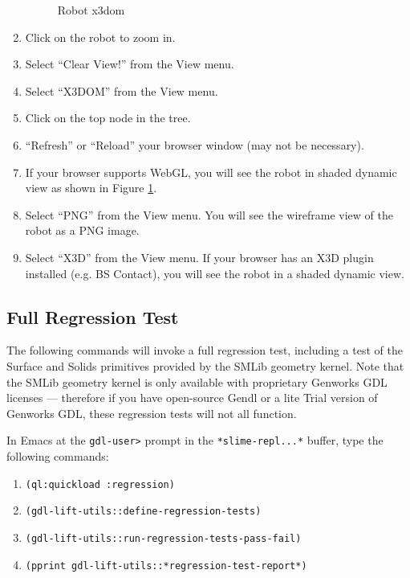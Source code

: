 \documentclass [11pt]{book}
\begin{document}
\begin{enumerate}
\begin{figure}
\caption{Robot x3dom}

\label{fig:tasty-robot-x3dom}

\end{figure}

\item Click on the robot to zoom in.

\item Select ``Clear View!'' from the View menu.

\item Select ``X3DOM'' from the View menu.

\item Click on the top node in the tree.

\item ``Refresh'' or ``Reload'' your browser window (may not be necessary).

\item If your browser supports WebGL, you will see the robot in shaded dynamic view as shown in Figure
\ref{fig:tasty-robot-x3dom}.

\item Select ``PNG'' from the View menu. You will see the
	 wireframe view of the robot as a PNG image.

\item Select ``X3D'' from the View menu. If your browser
has an X3D plugin installed (e.g. BS Contact), you will see the robot
in a shaded dynamic view.

\end{enumerate}



\subsection{Full Regression Test}

\label{subsec:fullregressiontest}

The following commands will invoke a full regression test,
including a test of the Surface and Solids primitives provided by the
SMLib geometry kernel. Note that the SMLib geometry kernel is only
available with proprietary Genworks GDL licenses --- therefore if you
have open-source Gendl or a lite Trial version of Genworks GDL, 
these regression tests will not all function.

In Emacs at the \texttt{gdl-user>} prompt in the \texttt{*slime-repl...*} buffer, type the following commands:

\begin{enumerate}

\item \texttt{(ql:quickload :regression)}

\item \texttt{(gdl-lift-utils::define-regression-tests)}

\item \texttt{(gdl-lift-utils::run-regression-tests-pass-fail)}

\item \texttt{(pprint gdl-lift-utils::*regression-test-report*)}

\end{enumerate}
\end{document}
